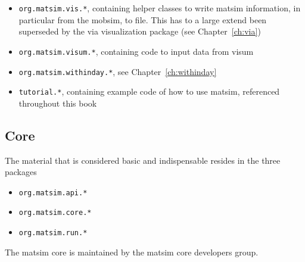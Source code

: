 \begin{itemize}
\item \lstinline{org.matsim.vis.*}, containing helper classes to write \gls{matsim} information, in particular from the \gls{mobsim}, to file.  This has to a large extend been superseded by the \gls{via} visualization package (see Chapter~\ref{ch:via})
\item \lstinline{org.matsim.visum.*}, containing code to input data from \gls{visum}
\item \lstinline{org.matsim.withinday.*}, see Chapter~\ref{ch:withinday}
\item \lstinline{tutorial.*}, containing example code of how to use \gls{matsim}, referenced throughout this book
\end{itemize}

\subsection{Core}
\label{sec:extending-core}
The material that is considered basic and indispensable resides in the three packages 
\begin{itemize}\styleItemize
\item \lstinline{org.matsim.api.*}
\item \lstinline{org.matsim.core.*}
\item \lstinline{org.matsim.run.*}
\end{itemize}
%
The \gls{matsim} core is maintained by the \gls{matsim} core developers group.

 


